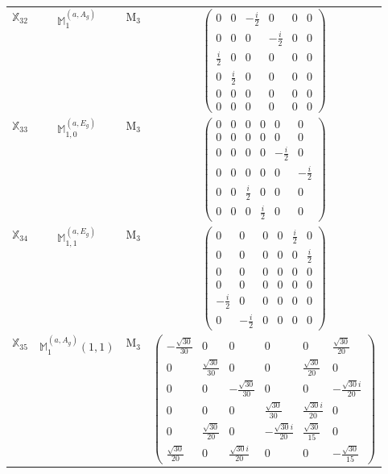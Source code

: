 \documentclass[fleqn,10pt,landscape]{article}
\begin{document}
\begin{itemize}
\begin{center}
\begin{longtable}{c|c|c|c}
$ \mathbb{X}_{32} $ & $\mathbb{M}_{1}^{(a,A_{g})}$ & M$_{3}$ & $\begin{pmatrix} 0 & 0 & - \frac{i}{2} & 0 & 0 & 0 \\ 0 & 0 & 0 & - \frac{i}{2} & 0 & 0 \\ \frac{i}{2} & 0 & 0 & 0 & 0 & 0 \\ 0 & \frac{i}{2} & 0 & 0 & 0 & 0 \\ 0 & 0 & 0 & 0 & 0 & 0 \\ 0 & 0 & 0 & 0 & 0 & 0 \end{pmatrix}$ \\
$ \mathbb{X}_{33} $ & $\mathbb{M}_{1,0}^{(a,E_{g})}$ & M$_{3}$ & $\begin{pmatrix} 0 & 0 & 0 & 0 & 0 & 0 \\ 0 & 0 & 0 & 0 & 0 & 0 \\ 0 & 0 & 0 & 0 & - \frac{i}{2} & 0 \\ 0 & 0 & 0 & 0 & 0 & - \frac{i}{2} \\ 0 & 0 & \frac{i}{2} & 0 & 0 & 0 \\ 0 & 0 & 0 & \frac{i}{2} & 0 & 0 \end{pmatrix}$ \\
$ \mathbb{X}_{34} $ & $\mathbb{M}_{1,1}^{(a,E_{g})}$ & M$_{3}$ & $\begin{pmatrix} 0 & 0 & 0 & 0 & \frac{i}{2} & 0 \\ 0 & 0 & 0 & 0 & 0 & \frac{i}{2} \\ 0 & 0 & 0 & 0 & 0 & 0 \\ 0 & 0 & 0 & 0 & 0 & 0 \\ - \frac{i}{2} & 0 & 0 & 0 & 0 & 0 \\ 0 & - \frac{i}{2} & 0 & 0 & 0 & 0 \end{pmatrix}$ \\
$ \mathbb{X}_{35} $ & $\mathbb{M}_{1}^{(a,A_{g})}(1,1)$ & M$_{3}$ & $\begin{pmatrix} - \frac{\sqrt{30}}{30} & 0 & 0 & 0 & 0 & \frac{\sqrt{30}}{20} \\ 0 & \frac{\sqrt{30}}{30} & 0 & 0 & \frac{\sqrt{30}}{20} & 0 \\ 0 & 0 & - \frac{\sqrt{30}}{30} & 0 & 0 & - \frac{\sqrt{30} i}{20} \\ 0 & 0 & 0 & \frac{\sqrt{30}}{30} & \frac{\sqrt{30} i}{20} & 0 \\ 0 & \frac{\sqrt{30}}{20} & 0 & - \frac{\sqrt{30} i}{20} & \frac{\sqrt{30}}{15} & 0 \\ \frac{\sqrt{30}}{20} & 0 & \frac{\sqrt{30} i}{20} & 0 & 0 & - \frac{\sqrt{30}}{15} \end{pmatrix}$ \\

\end{longtable}
\end{center}
\end{itemize}
\end{document}
